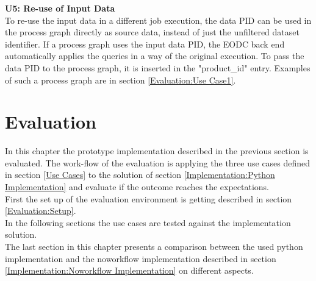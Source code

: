 \documentclass[draft,final]{vutinfth} %
\begin{document}
\textbf{U5: Re-use of Input Data} \\
To re-use the input data in a different job execution, the data PID can be used in the process graph directly as source data, instead of just the unfiltered dataset identifier. If a process graph uses the input data PID, the EODC back end automatically applies the queries in a way of the original execution. To pass the data PID to the process graph, it is inserted in the "product\_id" entry. Examples of such a process graph are in section \ref{Evaluation:Use Case1}.  


\chapter{Evaluation}\label{Evaluation}
In this chapter the prototype implementation described in the previous section is evaluated. The work-flow of the evaluation is applying the three use cases defined in section \ref{Use Cases} to the solution of section \ref{Implementation:Python Implementation} and evaluate if the outcome reaches the expectations.\\ First the set up of the evaluation environment is getting described in section \ref{Evaluation:Setup}.\\ In the following sections the use cases are tested against the implementation solution.\\ The last section in this chapter presents a comparison between the used python implementation and the noworkflow implementation described in section \ref{Implementation:Noworkflow Implementation} on different aspects. 
\end{document}
